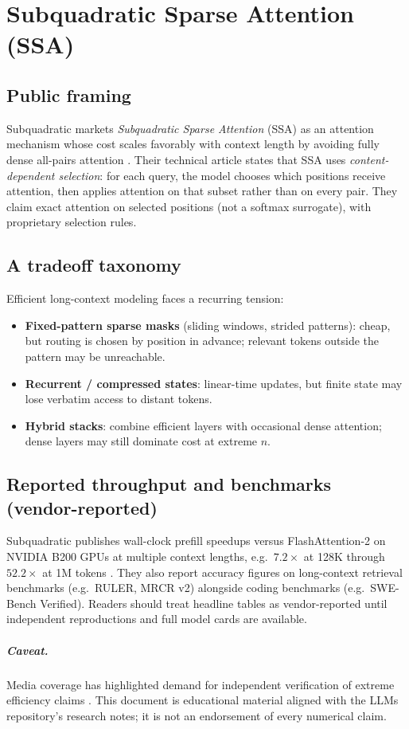 \chapter{Subquadratic Sparse Attention (SSA)}

\section{Public framing}

Subquadratic markets \emph{Subquadratic Sparse Attention} (SSA) as an attention mechanism whose cost scales
favorably with context length by avoiding fully dense all-pairs attention \cite{subq2026ssa}.
Their technical article states that SSA uses \emph{content-dependent selection}: for each query, the model
chooses which positions receive attention, then applies attention on that subset rather than on every pair.
They claim exact attention on selected positions (not a softmax surrogate), with proprietary selection rules.

\section{A tradeoff taxonomy}

Efficient long-context modeling faces a recurring tension:
\begin{itemize}
  \item \textbf{Fixed-pattern sparse masks} (sliding windows, strided patterns): cheap, but routing is chosen
    by position in advance; relevant tokens outside the pattern may be unreachable.
  \item \textbf{Recurrent / compressed states}: linear-time updates, but finite state may lose verbatim access
    to distant tokens.
  \item \textbf{Hybrid stacks}: combine efficient layers with occasional dense attention; dense layers may
    still dominate cost at extreme $n$.
\end{itemize}

\section{Reported throughput and benchmarks (vendor-reported)}

Subquadratic publishes wall-clock prefill speedups versus FlashAttention-2 on NVIDIA B200 GPUs at multiple
context lengths, e.g.\ $7.2\times$ at 128K through $52.2\times$ at 1M tokens \cite{subq2026ssa}. They also report
accuracy figures on long-context retrieval benchmarks (e.g.\ RULER, MRCR v2) alongside coding benchmarks (e.g.\
SWE-Bench Verified). Readers should treat headline tables as vendor-reported until independent reproductions and
full model cards are available.

\paragraph{Caveat.}
Media coverage has highlighted demand for independent verification of extreme efficiency claims
\cite{venturebeat2026subq}. This document is educational material aligned with the LLMs repository's research
notes; it is not an endorsement of every numerical claim.
